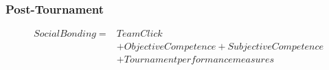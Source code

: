 {       \subsubsection{Post-Tournament\label{app8:MLM2a}}


            \begin{align*}
              Social Bonding   =& Team Click\\
                              &+ Objective Competence + Subjective Competence  \\
                              &+ Tournament performance measures \\
            \end{align*}

          \bigskip

        

}
